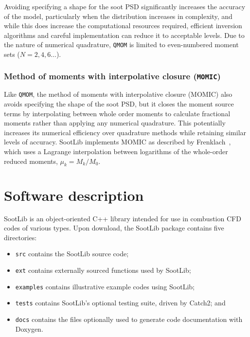 \documentclass[preprint,letterpaper]{elsarticle}
\begin{document}
Avoiding specifying a shape for the soot PSD significantly increases the accuracy of the model, particularly when the distribution increases in complexity, and while this does increase the computational resources required, efficient inversion algorithms and careful implementation can reduce it to acceptable levels. Due to the nature of numerical quadrature, \texttt{QMOM} is limited to even-numbered moment sets ($N=2,4,6\ldots$).

\subsubsection{Method of moments with interpolative closure (\texttt{MOMIC})}
\label{sss:momic}

Like \texttt{QMOM}, the method of moments with interpolative closure (MOMIC) also avoids specifying the shape of the soot PSD, but it closes the moment source terms by interpolating between whole order moments to calculate fractional moments rather than applying any numerical quadrature. This potentially increases its numerical efficiency over quadrature methods while retaining similar levels of accuracy. SootLib implements MOMIC as described by Frenklach~\cite{Frenklach_2002b,Frenklach_1987}, which uses a Lagrange interpolation between logarithms of the  whole-order reduced moments, $\mu_k = M_k/M_0$.




\section{Software description}
\label{s:architecture}

SootLib is an object-oriented C++ library intended for use in combustion CFD codes of various types. Upon download, the SootLib package contains five directories:
\begin{itemize}
    \item[\faFolderO] \texttt{src} contains the SootLib source code;
    \item[\faFolderO] \texttt{ext} contains externally sourced functions used by SootLib;
    \item[\faFolderO] \texttt{examples} contains illustrative example codes using SootLib;
    \item[\faFolderO] \texttt{tests} contains SootLib's optional testing suite, driven by Catch2; and
    \item[\faFolderO] \texttt{docs} contains the files optionally used to generate code documentation with Doxygen.
\end{itemize}
\end{document}
